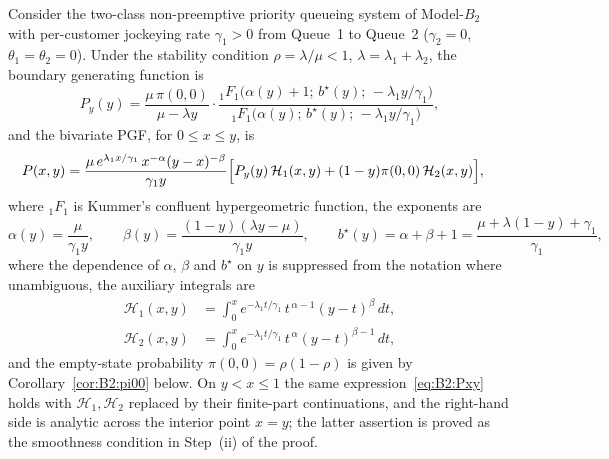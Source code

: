 \begin{theorem}\label{thm:B2:PGF}
    Consider the two-class non-preemptive priority queueing system of Model-$B_2$ with
    per-customer jockeying rate $\gamma_1>0$ from Queue~1 to Queue~2 ($\gamma_2=0$,
    $\theta_1=\theta_2=0$). Under the stability condition $\rho=\lambda/\mu<1$,
    $\lambda=\lambda_1+\lambda_2$, the boundary generating function is
    \begin{equation}
        P_y(y) = \frac{\mu\,\pi(0,0)}{\mu-\lambda y}
        \cdot\frac{{}_1F_1\!\bigl(\alpha(y)+1;\,b^\star(y);\,-\lambda_1 y/\gamma_1\bigr)}
                  {{}_1F_1\!\bigl(\alpha(y);\,b^\star(y);\,-\lambda_1 y/\gamma_1\bigr)},
        \label{eq:B2:Py_thm}
    \end{equation}
    and the bivariate PGF, for $0\le x\le y$, is
    \begin{align}
        P(x,y) &= \frac{\mu\,e^{\lambda_1 x/\gamma_1}\,x^{-\alpha}(y-x)^{-\beta}}{\gamma_1 y}
        \Bigl[P_y(y)\,\mathcal{H}_1(x,y)
              + (1-y)\pi(0,0)\,\mathcal{H}_2(x,y)\Bigr],
        \label{eq:B2:Pxy}
    \end{align}
    where ${}_1F_1$ is Kummer's confluent hypergeometric function, the exponents are
    \begin{equation}
        \alpha(y) = \frac{\mu}{\gamma_1 y}, \qquad
        \beta(y)  = \frac{(1-y)(\lambda y-\mu)}{\gamma_1 y}, \qquad
        b^\star(y) = \alpha+\beta+1 = \frac{\mu+\lambda(1-y)+\gamma_1}{\gamma_1},
        \label{eq:B2:exponents_thm}
    \end{equation}
    where the dependence of $\alpha$, $\beta$ and $b^\star$ on $y$ is suppressed from the notation where unambiguous, the auxiliary integrals are
    \begin{align}
        \mathcal{H}_1(x,y) &= \int_0^x e^{-\lambda_1 t/\gamma_1}\,t^{\,\alpha-1}(y-t)^{\beta}\,dt,
        \label{eq:B2:I1}\\
        \mathcal{H}_2(x,y) &= \int_0^x e^{-\lambda_1 t/\gamma_1}\,t^{\,\alpha}(y-t)^{\beta-1}\,dt,
        \label{eq:B2:I2}
    \end{align}
    and the empty-state probability $\pi(0,0)=\rho(1-\rho)$ is given by Corollary~\ref{cor:B2:pi00} below.
    On $y<x\le1$ the same expression~\eqref{eq:B2:Pxy} holds with $\mathcal{H}_1,\mathcal{H}_2$
    replaced by their finite-part continuations, and the right-hand side is analytic across
    the interior point $x=y$; the latter assertion is proved as the smoothness condition in
    Step~(ii) of the proof.
\end{theorem}

